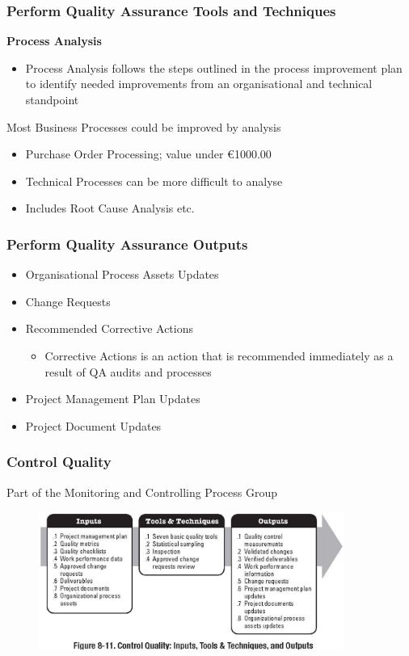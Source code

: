 \begin{frame}
\frametitle{Perform Quality Assurance \hfill Tools and Techniques}
\textbf{Process Analysis}
\begin{itemize}
	\item Process Analysis follows the steps outlined in the process improvement plan to identify needed improvements from an organisational and technical standpoint
\end{itemize}
Most Business Processes could be improved by analysis
\begin{itemize}
	\item Purchase Order Processing; value under \euro1000.00
	\item Technical Processes can be more difficult to analyse
	\item Includes Root Cause Analysis etc.
\end{itemize}
\end{frame}




\begin{frame}
\frametitle{Perform Quality Assurance \hfill Outputs}
\begin{itemize}
	\item Organisational Process Assets Updates
	\item Change Requests
	\item Recommended Corrective Actions
\begin{itemize}	
	\item Corrective Actions is an action that is recommended immediately as a result of QA audits and processes
\end{itemize}
	\item Project Management Plan Updates
	\item Project Document Updates
\end{itemize}
\end{frame}




\begin{frame}
\frametitle{Control Quality}
Part of the Monitoring and Controlling Process Group
\begin{figure}
	\centering
		\includegraphics[width = 10cm]{images/Fig8-11.jpg}
	\label{fig:8-11}
\end{figure}
\end{frame}




